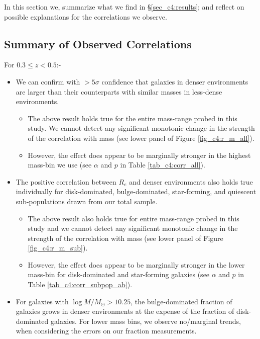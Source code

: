 In this section we, summarize what we find in \S \ref{sec_c4:results}; and reflect on possible explanations for the correlations we observe. 

\subsection{Summary of Observed Correlations} \label{sec_c4:summary}

For $0.3 \leq z < 0.5$:-

\begin{itemize}
    \item We can confirm with $>5 \sigma$ confidence that galaxies in denser environments are larger than their counterparts with similar masses in less-dense environments. 
    \begin{itemize}
        \item The above result holds true for the entire mass-range probed in this study. We cannot detect any significant monotonic change in the strength of the correlation with mass (see lower panel of Figure \ref{fig_c4:r_m_all}). 
        \item However, the effect does appear to be marginally stronger in the highest mass-bin we use (see $\alpha$ and $p$ in Table \ref{tab_c4:corr_all}).
    \end{itemize}
    \item The positive correlation between $R_e$ and denser environments also holds true individually for disk-dominated, bulge-dominated, star-forming, and quiescent sub-populations drawn from our total sample. 
    \begin{itemize}
        \item The above result also holds true for entire mass-range probed in this study and we cannot detect any significant monotonic change in the strength of the correlation with mass (see lower panel of Figure \ref{fig_c4:r_m_sub}).
        \item However, the effect does appear to be marginally stronger in the lower mass-bin for disk-dominated and star-forming galaxies (see $\alpha$ and $p$ in Table \ref{tab_c4:corr_subpop_ab}).
    \end{itemize}  
    \item For galaxies with $\log M/M_\odot > 10.25$, the bulge-dominated fraction of galaxies grows in denser environments at the expense of the fraction of disk-dominated galaxies. For lower mass bins, we observe no/marginal trends, when considering the errors on our fraction measurements.
\end{itemize}

